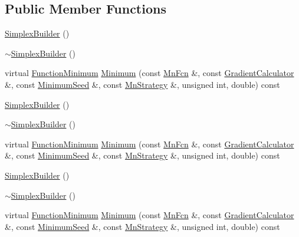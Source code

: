 \subsection*{Public Member Functions}
\begin{DoxyCompactItemize}
\item 
\mbox{\hyperlink{classROOT_1_1Minuit2_1_1SimplexBuilder_a2fdf7201f34b894f5f237e673c55492a}{Simplex\+Builder}} ()
\item 
\mbox{\hyperlink{classROOT_1_1Minuit2_1_1SimplexBuilder_a2559aceabff61d3361e5750aa6b97f73}{$\sim$\+Simplex\+Builder}} ()
\item 
virtual \mbox{\hyperlink{classROOT_1_1Minuit2_1_1FunctionMinimum}{Function\+Minimum}} \mbox{\hyperlink{classROOT_1_1Minuit2_1_1SimplexBuilder_a82c52765929e3f4a41b1abe1473d4140}{Minimum}} (const \mbox{\hyperlink{classROOT_1_1Minuit2_1_1MnFcn}{Mn\+Fcn}} \&, const \mbox{\hyperlink{classROOT_1_1Minuit2_1_1GradientCalculator}{Gradient\+Calculator}} \&, const \mbox{\hyperlink{classROOT_1_1Minuit2_1_1MinimumSeed}{Minimum\+Seed}} \&, const \mbox{\hyperlink{classROOT_1_1Minuit2_1_1MnStrategy}{Mn\+Strategy}} \&, unsigned int, double) const
\item 
\mbox{\hyperlink{classROOT_1_1Minuit2_1_1SimplexBuilder_a2fdf7201f34b894f5f237e673c55492a}{Simplex\+Builder}} ()
\item 
\mbox{\hyperlink{classROOT_1_1Minuit2_1_1SimplexBuilder_a2559aceabff61d3361e5750aa6b97f73}{$\sim$\+Simplex\+Builder}} ()
\item 
virtual \mbox{\hyperlink{classROOT_1_1Minuit2_1_1FunctionMinimum}{Function\+Minimum}} \mbox{\hyperlink{classROOT_1_1Minuit2_1_1SimplexBuilder_a68ea5d16ee89941e9674eb673dbde593}{Minimum}} (const \mbox{\hyperlink{classROOT_1_1Minuit2_1_1MnFcn}{Mn\+Fcn}} \&, const \mbox{\hyperlink{classROOT_1_1Minuit2_1_1GradientCalculator}{Gradient\+Calculator}} \&, const \mbox{\hyperlink{classROOT_1_1Minuit2_1_1MinimumSeed}{Minimum\+Seed}} \&, const \mbox{\hyperlink{classROOT_1_1Minuit2_1_1MnStrategy}{Mn\+Strategy}} \&, unsigned int, double) const
\item 
\mbox{\hyperlink{classROOT_1_1Minuit2_1_1SimplexBuilder_a2fdf7201f34b894f5f237e673c55492a}{Simplex\+Builder}} ()
\item 
\mbox{\hyperlink{classROOT_1_1Minuit2_1_1SimplexBuilder_a2559aceabff61d3361e5750aa6b97f73}{$\sim$\+Simplex\+Builder}} ()
\item 
virtual \mbox{\hyperlink{classROOT_1_1Minuit2_1_1FunctionMinimum}{Function\+Minimum}} \mbox{\hyperlink{classROOT_1_1Minuit2_1_1SimplexBuilder_a68ea5d16ee89941e9674eb673dbde593}{Minimum}} (const \mbox{\hyperlink{classROOT_1_1Minuit2_1_1MnFcn}{Mn\+Fcn}} \&, const \mbox{\hyperlink{classROOT_1_1Minuit2_1_1GradientCalculator}{Gradient\+Calculator}} \&, const \mbox{\hyperlink{classROOT_1_1Minuit2_1_1MinimumSeed}{Minimum\+Seed}} \&, const \mbox{\hyperlink{classROOT_1_1Minuit2_1_1MnStrategy}{Mn\+Strategy}} \&, unsigned int, double) const
\end{DoxyCompactItemize}


